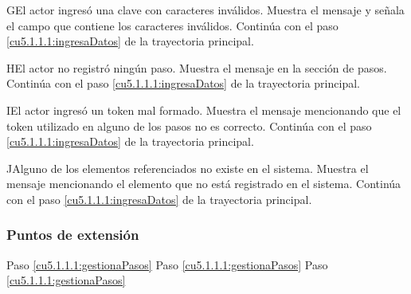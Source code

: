  \begin{UCtrayectoriaA}{G}{El actor ingresó una clave con caracteres inválidos.}
    \UCpaso[\UCsist] Muestra el mensaje  y señala el campo que contiene los caracteres inválidos.
    \UCpaso[] Continúa con el paso \ref{cu5.1.1.1:ingresaDatos} de la trayectoria principal.
 \end{UCtrayectoriaA}
 \begin{UCtrayectoriaA}{H}{El actor no registró ningún paso.}
    \UCpaso[\UCsist] Muestra el mensaje  en la sección de pasos.
    \UCpaso[] Continúa con el paso \ref{cu5.1.1.1:ingresaDatos} de la trayectoria principal.
 \end{UCtrayectoriaA}
 \begin{UCtrayectoriaA}{I}{El actor ingresó un token mal formado.}
    \UCpaso[\UCsist] Muestra el mensaje  mencionando que el token utilizado en alguno de los pasos no es correcto.
    \UCpaso[] Continúa con el paso \ref{cu5.1.1.1:ingresaDatos} de la trayectoria principal.
 \end{UCtrayectoriaA}
 \begin{UCtrayectoriaA}{J}{Alguno de los elementos referenciados no existe en el sistema.}
    \UCpaso[\UCsist] Muestra el mensaje  mencionando el elemento que no está registrado en el sistema.
    \UCpaso[] Continúa con el paso \ref{cu5.1.1.1:ingresaDatos} de la trayectoria principal.
 \end{UCtrayectoriaA}

\subsubsection{Puntos de extensión}

	{Paso \ref{cu5.1.1.1:gestionaPasos}}
	{}
	{Paso \ref{cu5.1.1.1:gestionaPasos}}
	{}	
	{Paso \ref{cu5.1.1.1:gestionaPasos}}
	{}
  